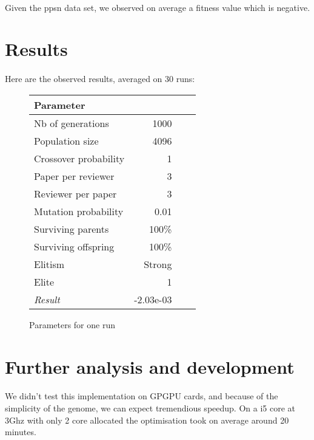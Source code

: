 \documentclass{article}
\begin{document}
    \paragraph{} %
    \label{par:}
      Given the ppsn data set, we observed on average a fitness value which is
      negative.
    
   
   \section{Results} %
   \label{sec:Result}
   \paragraph{} %
   
     \label{par:}
       Here are the observed results, averaged on 30 runs:
    
    \begin{figure}
    \begin{small} 
    \begin{tabular}{lrrr}
      Parameter &  \\
      \hline
      Nb of generations & 1000 \\
      Population size & 4096  \\
      Crossover probability & 1 \\
      Paper per reviewer & 3 \\
      Reviewer per paper & 3 \\
      Mutation probability & 0.01\\
      Surviving parents & 100\%  \\
      Surviving offspring& 100\% \\
      Elitism & Strong \\
      Elite & 1 \\ \hline
      \emph{Result} & -2.03e-03 \\
      \hline 
      \end{tabular}
      \caption{Parameters for one run}  
      \end{small}
      \end{figure}

   \section{Further analysis and development} %
   \label{sec:section name}
   \paragraph{} %
   \label{par:}
   
     We didn't test this implementation on GPGPU cards, and because of the
     simplicity of the genome, we can expect tremendious speedup. On a i5 core at
     3Ghz with only 2 core allocated the optimisation took on average around 20 minutes. 
  
\end{document}
